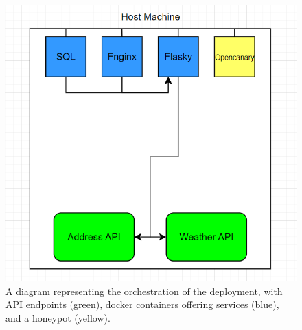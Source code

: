 \begin{figure}[h]
    \centering
    \includegraphics[width=.8\linewidth]{Orch_Diagram.png}
    \caption{A diagram representing the orchestration of the deployment, with API endpoints (green), docker containers offering services (blue), and a honeypot (yellow).}
    \label{fig:enter-label}
\end{figure}
